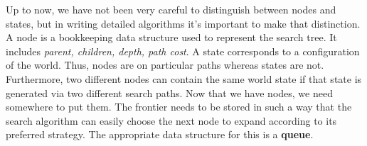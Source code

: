 Up to now, we have not been very careful to distinguish between nodes and states, but in writing detailed algorithms it’s important to make that distinction. A node is a bookkeeping data structure used to represent the search tree. It includes \textit{parent, children, depth, path cost}. A state corresponds to a configuration of the
world. Thus, nodes are on particular paths whereas states are not. Furthermore, two different nodes can contain the same world state if that state is generated via two different search paths.\newline\newline
Now that we have nodes, we need somewhere to put them. The frontier needs to be stored in such a way that the search algorithm can easily choose the next node to expand according to its preferred strategy. The appropriate data structure for this is a \textbf{queue}.

